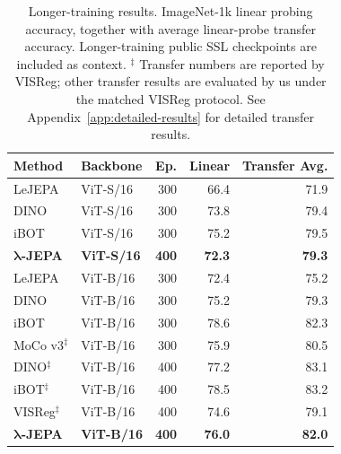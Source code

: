 \documentclass{article} %
\theoremstyle{remark}
\begin{document}
\begin{table}[t]
\centering
\small
\begin{tabular}{llrrr}
\toprule
Method & Backbone & Ep. & Linear & Transfer Avg. \\
\midrule
LeJEPA & ViT-S/16 & 300 & 66.4 & 71.9 \\
DINO   & ViT-S/16 & 300 & 73.8 & 79.4 \\
iBOT   & ViT-S/16 & 300 & 75.2 & 79.5 \\
\textbf{$\bm{\lambda}$-JEPA} & \textbf{ViT-S/16} & \textbf{400}
& \textbf{72.3} & \textbf{79.3} \\
\midrule
LeJEPA & ViT-B/16 & 300 & 72.4 & 75.2 \\
DINO   & ViT-B/16 & 300 & 75.2 & 79.3 \\
iBOT   & ViT-B/16 & 300 & 78.6 & 82.3 \\
MoCo v3$^\ddag$ & ViT-B/16 & 300 & 75.9 & 80.5 \\
DINO$^\ddag$    & ViT-B/16 & 400 & 77.2 & 83.1 \\
iBOT$^\ddag$    & ViT-B/16 & 400 & 78.5 & 83.2 \\
VISReg$^\ddag$  & ViT-B/16 & 400 & 74.6 & 79.1 \\
\textbf{$\bm{\lambda}$-JEPA} & \textbf{ViT-B/16} & \textbf{400}
& \textbf{76.0} & \textbf{82.0} \\
\bottomrule
\end{tabular}
\caption{
Longer-training results. ImageNet-1k linear probing accuracy, together
with average linear-probe transfer accuracy. Longer-training public SSL
checkpoints are included as context. $^\ddag$ Transfer numbers are
reported by VISReg; other transfer results are evaluated by us under the
matched VISReg protocol. See Appendix~\ref{app:detailed-results} for
detailed transfer results.
}
\label{tab:long-training-results}
\end{table}
\end{document}
